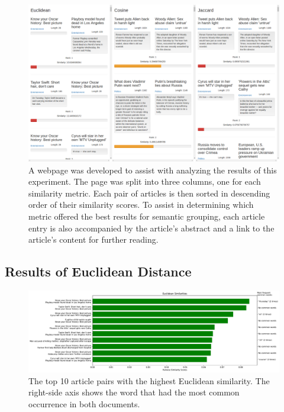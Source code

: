 \documentclass[11pt]{article}
\begin{document}
\begin{figure}[h] \label{fig:website}
  \centering
  \includegraphics[width=\textwidth]{figures/webpage}
  \caption{A webpage was developed to assist with analyzing the results of this experiment.
  The page was split into three columns, one for each similarity metric.
  Each pair of articles is then sorted in descending order of their similarity scores.
  To assist in determining which metric offered the best results for semantic grouping, each article entry is also accompanied by the article's abstract and a link to the article's content for further reading.}
\end{figure}

\subsection{Results of Euclidean Distance}

\begin{figure}[h] \label{fig:euclid}
  \centering
  \includegraphics[width=\textwidth]{figures/euclidean_most_sim}
  \caption{The top 10 article pairs with the highest Euclidean similarity.
  The right-side axis shows the word that had the most common occurrence in both documents.}
\end{figure}
\end{document}
